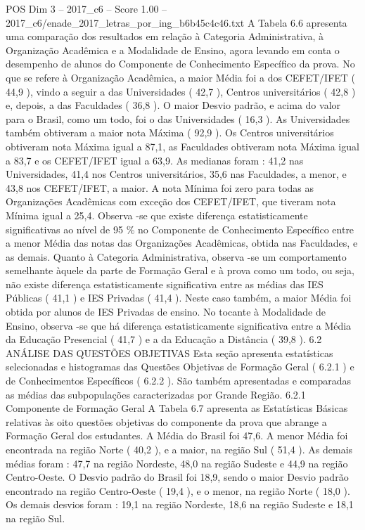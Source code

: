 \begin{textsample}{POS Dim 3 – 2017\_c6 – Score 1.00 – 2017\_c6/enade\_2017\_letras\_por\_ing\_b6b45c4c46.txt}
A Tabela 6.6 apresenta uma comparação dos resultados em relação à Categoria Administrativa, à Organização Acadêmica e a Modalidade de Ensino, agora levando em conta o desempenho de alunos do Componente de Conhecimento Específico da prova.
No que se refere à Organização Acadêmica, a maior Média foi a dos CEFET/IFET ( 44,9 ), vindo a seguir a das Universidades ( 42,7 ), Centros universitários ( 42,8 ) e, depois, a das Faculdades ( 36,8 ).
O maior Desvio padrão, e acima do valor para o Brasil, como um todo, foi o das Universidades ( 16,3 ).
As Universidades também obtiveram a maior nota Máxima ( 92,9 ).
Os Centros universitários obtiveram nota Máxima igual a 87,1, as Faculdades obtiveram nota Máxima igual a 83,7 e os CEFET/IFET igual a 63,9.
As medianas foram : 41,2 nas Universidades, 41,4 nos Centros universitários, 35,6 nas Faculdades, a menor, e 43,8 nos CEFET/IFET, a maior.
A nota Mínima foi zero para todas as Organizações Acadêmicas com exceção dos CEFET/IFET, que tiveram nota Mínima igual a 25,4.
Observa -se que existe diferença estatisticamente significativas ao nível de 95 \% no Componente de Conhecimento Específico entre a menor Média das notas das Organizações Acadêmicas, obtida nas Faculdades, e as demais.
Quanto à Categoria Administrativa, observa -se um comportamento semelhante àquele da parte de Formação Geral e à prova como um todo, ou seja, não existe diferença estatisticamente significativa entre as médias das IES Públicas ( 41,1 ) e IES Privadas ( 41,4 ).
Neste caso também, a maior Média foi obtida por alunos de IES Privadas de ensino.
No tocante à Modalidade de Ensino, observa -se que há diferença estatisticamente significativa entre a Média da Educação Presencial ( 41,7 ) e a da Educação a Distância ( 39,8 ). 6.2 ANÁLISE DAS QUESTÕES OBJETIVAS Esta seção apresenta estatísticas selecionadas e histogramas das Questões Objetivas de Formação Geral ( 6.2.1 ) e de Conhecimentos Específicos ( 6.2.2 ).
São também apresentadas e comparadas as médias das subpopulações caracterizadas por Grande Região. 6.2.1 Componente de Formação Geral A Tabela 6.7 apresenta as Estatísticas Básicas relativas às oito questões objetivas do componente da prova que abrange a Formação Geral dos estudantes.
A Média do Brasil foi 47,6.
A menor Média foi encontrada na região Norte ( 40,2 ), e a maior, na região Sul ( 51,4 ).
As demais médias foram : 47,7 na região Nordeste, 48,0 na região Sudeste e 44,9 na região Centro-Oeste.
O Desvio padrão do Brasil foi 18,9, sendo o maior Desvio padrão encontrado na região Centro-Oeste ( 19,4 ), e o menor, na região Norte ( 18,0 ).
Os demais desvios foram : 19,1 na região Nordeste, 18,6 na região Sudeste e 18,1 na região Sul.

\end{textsample}
